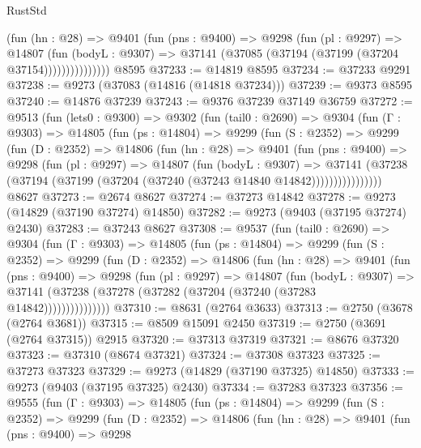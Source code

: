 \begin{lexlean}{RustStd}
\begin{coremodule}
{\begin{coremodule}
{{{{{{{{{{{{{{{{{{{{{{{{{{{{{{{{{{{{{{{{{{{{{{{{{{{{{{{                  (fun (hn : @28) =>
                  @9401
                    (fun (pns : @9400) =>
                    @9298
                      (fun (pl : @9297) =>
                      @14807
                        (fun (bodyL : @9307) =>
                        @37141 (@37085 (@37194 (@37199 (@37204 @37154)))))))))))))))
    @8595
@37233 := @14819 @8595
@37234 := @37233 @9291
@37238 := @9273 (@37083 (@14816 (@14818 @37234)))
@37239 := @9373 @8595
@37240 := @14876 @37239
@37243 := @9376 @37239 @37149 @36759
@37272 := @9513
    (fun (lets0 : @9300) =>
    @9302
      (fun (tail0 : @2690) =>
      @9304
        (fun (Γ : @9303) =>
        @14805
          (fun (ps : @14804) =>
          @9299
            (fun (S : @2352) =>
            @9299
              (fun (D : @2352) =>
              @14806
                (fun (hn : @28) =>
                @9401
                  (fun (pns : @9400) =>
                  @9298
                    (fun (pl : @9297) =>
                    @14807
                      (fun (bodyL : @9307) =>
                      @37141
                        (@37238
                          (@37194 (@37199 (@37204 (@37240 (@37243 @14840 @14842))))))))))))))))
    @8627
@37273 := @2674 @8627
@37274 := @37273 @14842
@37278 := @9273 (@14829 (@37190 @37274) @14850)
@37282 := @9273 (@9403 (@37195 @37274) @2430)
@37283 := @37243 @8627
@37308 := @9537
    (fun (tail0 : @2690) =>
    @9304
      (fun (Γ : @9303) =>
      @14805
        (fun (ps : @14804) =>
        @9299
          (fun (S : @2352) =>
          @9299
            (fun (D : @2352) =>
            @14806
              (fun (hn : @28) =>
              @9401
                (fun (pns : @9400) =>
                @9298
                  (fun (pl : @9297) =>
                  @14807
                    (fun (bodyL : @9307) =>
                    @37141 (@37238 (@37278 (@37282 (@37204 (@37240 (@37283 @14842)))))))))))))))
@37310 := @8631 (@2764 @3633)
@37313 := @2750 (@3678 (@2764 @3681))
@37315 := @8509 @15091 @2450
@37319 := @2750 (@3691 (@2764 @37315)) @2915
@37320 := @37313 @37319
@37321 := @8676 @37320
@37323 := @37310 (@8674 @37321)
@37324 := @37308 @37323
@37325 := @37273 @37323
@37329 := @9273 (@14829 (@37190 @37325) @14850)
@37333 := @9273 (@9403 (@37195 @37325) @2430)
@37334 := @37283 @37323
@37356 := @9555
    (fun (Γ : @9303) =>
    @14805
      (fun (ps : @14804) =>
      @9299
        (fun (S : @2352) =>
        @9299
          (fun (D : @2352) =>
          @14806
            (fun (hn : @28) =>
            @9401
              (fun (pns : @9400) =>
              @9298
}}}}}}}}}}}}}}}}}}}}}}}}}}}}}}}}}}}}}}}}}}}}}}}}}}}}}}}
\end{coremodule}}
\end{coremodule}
\end{lexlean}
